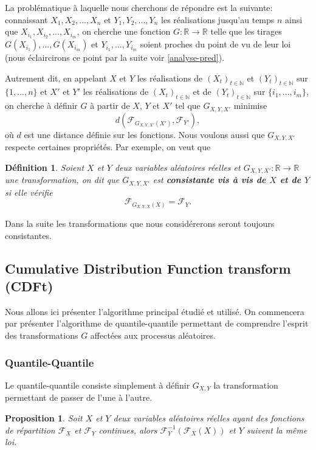 \documentclass[a4paper,10pt]{article}
\newtheorem{proposition}{Proposition}
\newtheorem{definition}{Définition}
\begin{document}
La problématique à laquelle nous cherchons de répondre est la suivante: connaissant $X_1,X_2,...,X_n$ et $Y_1,Y_2,...,Y_n$ les réalisations jusqu'au temps $n$ ainsi que $X_{i_1},X_{i_2},...,X_{i_m}$, on cherche une fonction $G: \mathbb{R} \to \mathbb{R}$ telle que les tirages $G(X_{i_1}),..., G(X_{i_m})$ et $Y_{i_1},...,Y_{i_m}$ soient proches du point de vu de leur loi (nous éclaircirons ce point par la suite voir \ref{analyse-pred}). 

Autrement dit, en appelant $X$ et $Y$ les réalisations de $(X_t)_{t \in \mathbb{N}}$ et $(Y_t)_{t \in \mathbb{N}}$ sur $\{1,...,n\}$ et $X'$ et $Y'$ les réalisations de $(X_t)_{t \in \mathbb{N}}$ et de $(Y_t)_{t \in \mathbb{N}}$ sur $\{i_1,...,i_m\}$, on cherche à définir $G$ à partir de $X$, $Y$ et $X'$ tel que $G_{X,Y,X'}$ minimise 
\[d(\mathcal{F}_{G_{X,Y,X'}(X')}, \mathcal{F}_{Y'}),\]
où $d$ est une distance définie sur les fonctions.
Nous voulons aussi que $G_{X,Y,X'}$ respecte certaines propriétés. Par exemple, on veut que 
\begin{definition}
	Soient $X$ et $Y$ deux variables aléatoires réelles et $G_{X,Y,X'}: \mathbb{R}\to \mathbb{R}$ une transformation, on dit que $G_{X,Y,X'}$ est \textbf{consistante vis à vis de $X$ et de $Y$} si elle vérifie 
\begin{equation}
	\label{cond-cons}
	{\mathcal{F}_{G_{X,Y,X}(X)}}= \mathcal{F}_{Y}.
\end{equation}
\end{definition}
Dans la suite les transformations que nous considérerons seront toujours consistantes.

\subsection{Cumulative Distribution Function transform (CDFt)}
Nous allons ici présenter l'algorithme principal étudié et utilisé. On commencera par présenter l'algorithme de quantile-quantile permettant de comprendre l'esprit des transformations $G$ affectées aux processus aléatoires.   
 
\subsubsection{Quantile-Quantile}
\label{Q-Q}
Le quantile-quantile consiste simplement à définir $G_{X,Y}$ la transformation permettant de passer de l'une à l'autre.  
\begin{proposition}
	Soit $X$ et $Y$ deux variables aléatoires réelles ayant des fonctions de répartition $\mathcal{F}_{X}$ et $\mathcal{F}_{Y}$ continues, alors 
	$\mathcal{F}^{-1}_Y (\mathcal{F}_X(X))$ et $Y$ suivent la même loi. 
\end{proposition}
\end{document}
